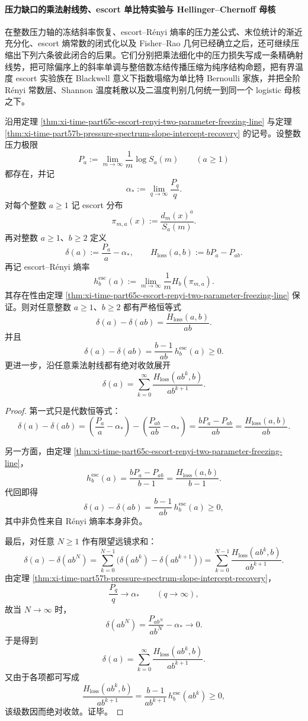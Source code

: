 \paragraph{压力缺口的乘法射线势、escort 单比特实验与 Hellinger--Chernoff 母核}
在整数压力轴的冻结斜率恢复、escort--Rényi 熵率的压力差公式、末位统计的渐近充分化、escort 熵常数的闭式化以及 Fisher--Rao 几何已经确立之后，还可继续压缩出下列六条彼此闭合的后果。它们分别把乘法细化中的压力损失写成一条精确射线势，把可除偏序上的斜率单调与整倍数冻结传播压缩为纯序结构命题，把有界温度 escort 实验族在 Blackwell 意义下指数塌缩为单比特 Bernoulli 家族，并把全阶 Rényi 常数层、Shannon 温度耗散以及二温度判别几何统一到同一个 logistic 母核之下。

\begin{theorem}[压力缺口是乘法熵亏损的精确射线势]\label{thm:xi-time-part65h-pressure-gap-ray-potential}
沿用定理 \ref{thm:xi-time-part65c-escort-renyi-two-parameter-freezing-line} 与定理 \ref{thm:xi-time-part57b-pressure-spectrum-slope-intercept-recovery} 的记号。设整数压力极限
\[
P_a:=\lim_{m\to\infty}\frac1m\log S_a(m)
\qquad (a\ge 1)
\]
都存在，并记
\[
\alpha_*:=\lim_{q\to\infty}\frac{P_q}{q}.
\]
对每个整数 \(a\ge 1\) 记 escort 分布
\[
\pi_{m,a}(x):=\frac{d_m(x)^a}{S_a(m)}.
\]
再对整数 \(a\ge 1\)、\(b\ge 2\) 定义
\[
\delta(a):=\frac{P_a}{a}-\alpha_*,
\qquad
H_{\mathrm{loss}}(a,b):=bP_a-P_{ab}.
\]
再记 escort--Rényi 熵率
\[
h_b^{\mathrm{esc}}(a):=
\lim_{m\to\infty}\frac1m H_b(\pi_{m,a}).
\]
其存在性由定理 \ref{thm:xi-time-part65c-escort-renyi-two-parameter-freezing-line} 保证。则对任意整数 \(a\ge 1\)、\(b\ge 2\) 都有严格恒等式
\[
\delta(a)-\delta(ab)=\frac{H_{\mathrm{loss}}(a,b)}{ab}.
\]
并且
\[
\delta(a)-\delta(ab)=\frac{b-1}{ab}\,h_b^{\mathrm{esc}}(a)\ge 0.
\]
更进一步，沿任意乘法射线都有绝对收敛展开
\[
\delta(a)=\sum_{k=0}^{\infty}\frac{H_{\mathrm{loss}}(ab^k,b)}{ab^{k+1}}.
\]
\end{theorem}
\begin{proof}
第一式只是代数恒等式：
\[
\delta(a)-\delta(ab)
=
\left(\frac{P_a}{a}-\alpha_*\right)
-\left(\frac{P_{ab}}{ab}-\alpha_*\right)
=
\frac{bP_a-P_{ab}}{ab}
=
\frac{H_{\mathrm{loss}}(a,b)}{ab}.
\]

另一方面，由定理 \ref{thm:xi-time-part65c-escort-renyi-two-parameter-freezing-line}，
\[
h_b^{\mathrm{esc}}(a)
=
\frac{bP_a-P_{ab}}{b-1}
=
\frac{H_{\mathrm{loss}}(a,b)}{b-1}.
\]
代回即得
\[
\delta(a)-\delta(ab)=\frac{b-1}{ab}\,h_b^{\mathrm{esc}}(a)\ge 0,
\]
其中非负性来自 Rényi 熵率本身非负。

最后，对任意 \(N\ge 1\) 作有限望远镜求和：
\[
\delta(a)-\delta(ab^N)
=
\sum_{k=0}^{N-1}\bigl(\delta(ab^k)-\delta(ab^{k+1})\bigr)
=
\sum_{k=0}^{N-1}\frac{H_{\mathrm{loss}}(ab^k,b)}{ab^{k+1}}.
\]
由定理 \ref{thm:xi-time-part57b-pressure-spectrum-slope-intercept-recovery}，
\[
\frac{P_q}{q}\longrightarrow \alpha_*
\qquad (q\to\infty),
\]
故当 \(N\to\infty\) 时，
\[
\delta(ab^N)=\frac{P_{ab^N}}{ab^N}-\alpha_*\longrightarrow 0.
\]
于是得到
\[
\delta(a)=\sum_{k=0}^{\infty}\frac{H_{\mathrm{loss}}(ab^k,b)}{ab^{k+1}}.
\]
又由于各项都可写成
\[
\frac{H_{\mathrm{loss}}(ab^k,b)}{ab^{k+1}}
=
\frac{b-1}{ab^{k+1}}\,h_b^{\mathrm{esc}}(ab^k)\ge 0,
\]
该级数因而绝对收敛。证毕。
\end{proof}

